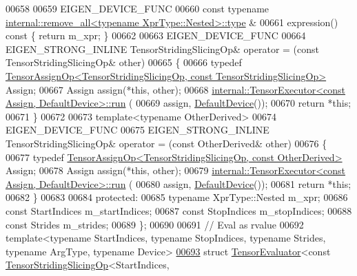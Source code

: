 \begin{DoxyCode}
00658 
00659     EIGEN\_DEVICE\_FUNC
00660     \textcolor{keyword}{const} \textcolor{keyword}{typename} \hyperlink{group___sparse_core___module}{internal::remove\_all<typename XprType::Nested>::type}
      &
00661     expression()\textcolor{keyword}{ const }\{ \textcolor{keywordflow}{return} m\_xpr; \}
00662 
00663     EIGEN\_DEVICE\_FUNC
00664     EIGEN\_STRONG\_INLINE TensorStridingSlicingOp& operator = (\textcolor{keyword}{const} TensorStridingSlicingOp& other)
00665     \{
00666       \textcolor{keyword}{typedef} 
      \hyperlink{class_eigen_1_1_tensor_assign_op}{TensorAssignOp<TensorStridingSlicingOp, const TensorStridingSlicingOp>}
       Assign;
00667       Assign assign(*\textcolor{keyword}{this}, other);
00668       \hyperlink{class_eigen_1_1internal_1_1_tensor_executor}{internal::TensorExecutor<const Assign, DefaultDevice>::run}
      (
00669           assign, \hyperlink{struct_eigen_1_1_default_device}{DefaultDevice}());
00670       \textcolor{keywordflow}{return} *\textcolor{keyword}{this};
00671     \}
00672 
00673     \textcolor{keyword}{template}<\textcolor{keyword}{typename} OtherDerived>
00674     EIGEN\_DEVICE\_FUNC
00675     EIGEN\_STRONG\_INLINE TensorStridingSlicingOp& operator = (\textcolor{keyword}{const} OtherDerived& other)
00676     \{
00677       \textcolor{keyword}{typedef} \hyperlink{class_eigen_1_1_tensor_assign_op}{TensorAssignOp<TensorStridingSlicingOp, const OtherDerived>}
       Assign;
00678       Assign assign(*\textcolor{keyword}{this}, other);
00679       \hyperlink{class_eigen_1_1internal_1_1_tensor_executor}{internal::TensorExecutor<const Assign, DefaultDevice>::run}
      (
00680           assign, \hyperlink{struct_eigen_1_1_default_device}{DefaultDevice}());
00681       \textcolor{keywordflow}{return} *\textcolor{keyword}{this};
00682     \}
00683 
00684   \textcolor{keyword}{protected}:
00685     \textcolor{keyword}{typename} XprType::Nested m\_xpr;
00686     \textcolor{keyword}{const} StartIndices m\_startIndices;
00687     \textcolor{keyword}{const} StopIndices m\_stopIndices;
00688     \textcolor{keyword}{const} Strides m\_strides;
00689 \};
00690 
00691 \textcolor{comment}{// Eval as rvalue}
00692 \textcolor{keyword}{template}<\textcolor{keyword}{typename} StartIndices, \textcolor{keyword}{typename} StopIndices, \textcolor{keyword}{typename} Str\textcolor{keywordtype}{id}es, \textcolor{keyword}{typename} ArgType, \textcolor{keyword}{typename} Device>
\hyperlink{struct_eigen_1_1_tensor_evaluator_3_01const_01_tensor_striding_slicing_op_3_01_start_indices_00_cee1ff5835d6d215dedc4ac8d5000be4}{00693} \textcolor{keyword}{struct }\hyperlink{struct_eigen_1_1_tensor_evaluator}{TensorEvaluator}<const \hyperlink{class_eigen_1_1_tensor_striding_slicing_op}{TensorStridingSlicingOp}<StartIndices, 

\end{DoxyCode}
